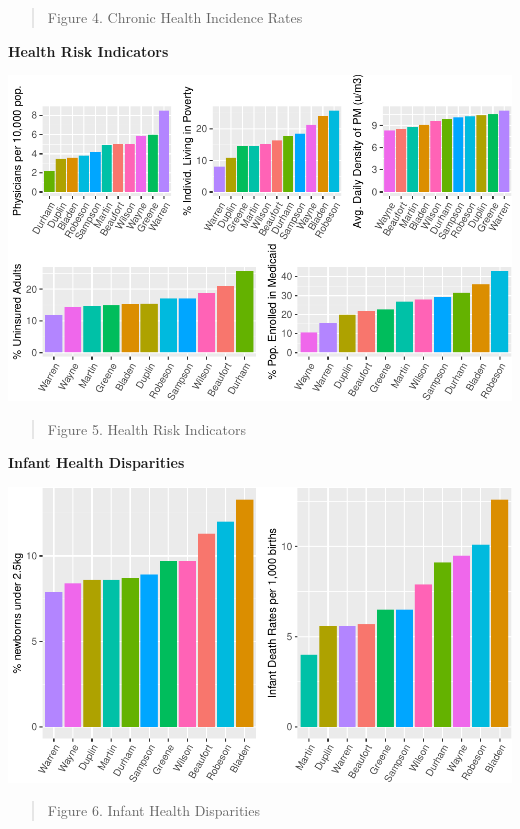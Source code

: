 \documentclass[
  12pt,
]{article}
\begin{document}
\begin{quote}
Figure 4. Chronic Health Incidence Rates
\end{quote}

\newpage

\textbf{Health Risk Indicators}

\includegraphics{JacobChan_FinalProject_HogFarms_files/figure-latex/final health-1.pdf}

\begin{quote}
Figure 5. Health Risk Indicators
\end{quote}

\newpage

\textbf{Infant Health Disparities}

\includegraphics{JacobChan_FinalProject_HogFarms_files/figure-latex/final infant-1.pdf}

\begin{quote}
Figure 6. Infant Health Disparities
\end{quote}
\end{document}
